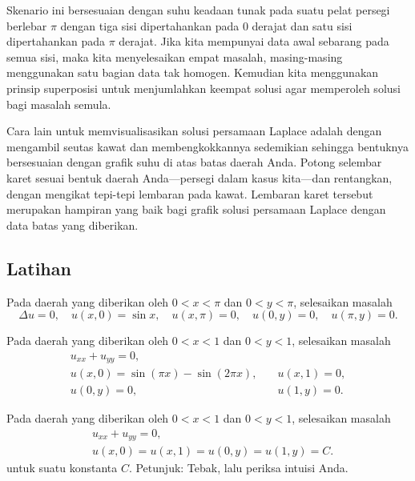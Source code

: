 Skenario ini
bersesuaian dengan suhu keadaan tunak pada suatu pelat persegi berlebar $\pi$
dengan tiga sisi dipertahankan pada 0 derajat dan satu sisi dipertahankan pada $\pi$ derajat.
Jika kita mempunyai data awal sebarang pada semua sisi, maka kita menyelesaikan empat masalah,
masing-masing menggunakan satu bagian data tak homogen.  Kemudian kita menggunakan prinsip
superposisi untuk menjumlahkan keempat solusi agar memperoleh solusi bagi
masalah semula.

Cara lain
untuk memvisualisasikan solusi persamaan Laplace adalah dengan
mengambil seutas kawat dan membengkokkannya
sedemikian sehingga bentuknya bersesuaian dengan grafik
suhu di atas batas daerah Anda.  Potong selembar karet sesuai
bentuk daerah Anda---persegi dalam kasus kita---dan rentangkan,
dengan mengikat tepi-tepi lembaran pada kawat.
Lembaran karet tersebut merupakan hampiran yang baik bagi grafik solusi
persamaan Laplace dengan data batas yang diberikan.

\subsection{Latihan}

\begin{exercise}
Pada daerah yang diberikan oleh $0 < x < \pi$ dan $0 < y < \pi$,
selesaikan masalah
\begin{equation*}
\Delta u = 0, \quad u(x,0) = \sin x, \quad u(x,\pi) = 0,
\quad u(0,y) = 0, 
\quad u(\pi,y) = 0 .
\end{equation*}
\end{exercise}

\begin{exercise}
Pada daerah yang diberikan oleh $0 < x < 1$ dan $0 < y < 1$,
selesaikan masalah
\begin{equation*}
\begin{array}{ll}
u_{xx} + u_{yy} = 0, & \\
u(x,0) = \sin (\pi x) - \sin (2\pi x), \quad & u(x,1) = 0, \\
u(0,y) = 0, \quad & u(1,y) = 0 .
\end{array}
\end{equation*}
\end{exercise}

\begin{exercise}
Pada daerah yang diberikan oleh $0 < x < 1$ dan $0 < y < 1$,
selesaikan masalah
\begin{align*}
& u_{xx} + u_{yy} = 0, \\
& u(x,0) = u(x,1) = u(0,y) = u(1,y) = C .
\end{align*}
untuk suatu konstanta $C$.  Petunjuk: Tebak, lalu periksa intuisi Anda.
\end{exercise}

